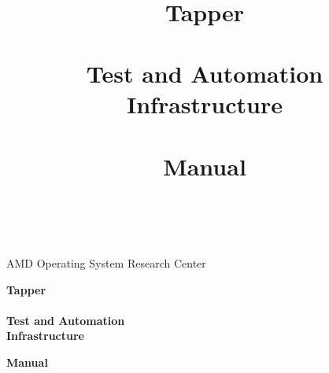 \documentclass[11pt,a4paper,twoside,DIV15,headinclude,footexclude,headsepline]{scrartcl}
\begin{document}

\thispagestyle{empty}

\vspace*{1\baselineskip}

\begin{center}

 {\Large
   AMD Operating System Research Center \\
 }

 \vspace*{6\baselineskip}

 \textbf{\Huge
  Tapper \\
  ~ \\
  Test and Automation \\
  Infrastructure \\
 }

 \vspace*{19\baselineskip}
 \textbf{\Huge Manual}
\end{center}

%

\newpage

\thispagestyle{empty}

~

\newpage


\thispagestyle{empty}

\title{
 \vspace*{2\baselineskip}
 ~ \\
 ~ \\
 Tapper \\
 ~ \\
 Test and Automation \\
 Infrastructure \\
 ~ \\
 Manual
}
\date{
 ~ \\
 \vspace*{8\baselineskip}
}
\publishers{
 AMD Operating System Research Center \\
 Steffen Schwigon, Maik Hentsche \\
 Copyright 2008-2012
}
\end{document}
